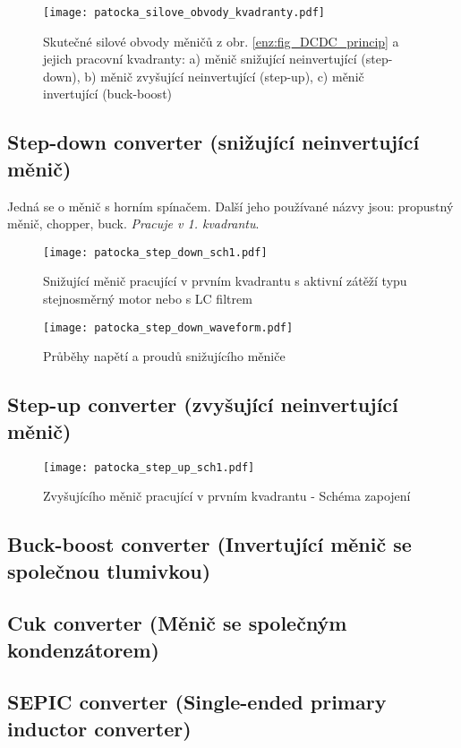         \begin{figure*}
          \centering
          \texttt{[image: patocka\_silove\_obvody\_kvadranty.pdf]}
          \caption[Skutečné silové obvody měničů a jejich kvadranty]{Skutečné silové obvody měničů
                   z obr. \ref{enz:fig_DCDC_princip} a jejich pracovní kvadranty: a) měnič snižující
                   neinvertující (step-down), b) měnič zvyšující neinvertující (step-up), c) měnič
                   invertující (buck-boost)}
          \label{enz:fig_silove_obv_kvadranty}
        \end{figure*}
        
\subsection{Step-down converter \newline(snižující neinvertující měnič)}\label{ENZ:kap_step_down}
  Jedná se o měnič s horním spínačem. Další jeho používané názvy jsou: propustný měnič, chopper,
  buck. \emph{Pracuje v 1. kvadrantu}.
  \begin{figure}[ht!]
    \centering
    \texttt{[image: patocka\_step\_down\_sch1.pdf]}
    \caption[Snižující měnič]{Snižující měnič pracující v prvním kvadrantu s aktivní zátěží
             typu stejnosměrný motor nebo s LC filtrem}
    \label{enz:fig_StepDown_sch1}
  \end{figure}

  \begin{figure}[ht!]
    \centering
    \texttt{[image: patocka\_step\_down\_waveform.pdf]}
    \caption[Snižující měnič - průběhy]{Průběhy napětí a proudů snižujícího měniče}
    \label{enz:fig_StepDown_wave1}
  \end{figure}

\subsection{Step-up converter (zvyšující neinvertující měnič)}\label{ENZ:kap_step_up}
  \begin{figure}[ht!]
    \centering
    \texttt{[image: patocka\_step\_up\_sch1.pdf]}
    \caption[Zvyšující měnič]{Zvyšujícího měnič pracující v prvním kvadrantu - Schéma zapojení}
    \label{enz:fig_StepUp_sch1}
  \end{figure}

\subsection{Buck-boost converter \newline(Invertující měnič se společnou tlumivkou)}\label{ENZ:kap_buck_boost}
\subsection{Cuk converter \newline(Měnič se společným konden\-zá\-to\-rem)}\label{ENZ:kap_cuk}
\subsection{SEPIC converter \newline(Single-ended primary inductor converter)}\label{ENZ:kap_sepic}         